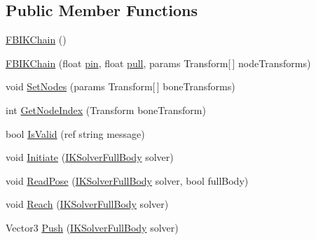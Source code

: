 \subsection*{Public Member Functions}
\begin{DoxyCompactItemize}
\item 
\mbox{\hyperlink{class_root_motion_1_1_final_i_k_1_1_f_b_i_k_chain_a2b1b04740285bfe0251784ab66a3631b}{F\+B\+I\+K\+Chain}} ()
\item 
\mbox{\hyperlink{class_root_motion_1_1_final_i_k_1_1_f_b_i_k_chain_a662dea6c56ed0f81a2218f8fcbd4b2e3}{F\+B\+I\+K\+Chain}} (float \mbox{\hyperlink{class_root_motion_1_1_final_i_k_1_1_f_b_i_k_chain_a389508e3ea390ab5599169de3f98514b}{pin}}, float \mbox{\hyperlink{class_root_motion_1_1_final_i_k_1_1_f_b_i_k_chain_a68367cba3452457c0dea9ed4918f6e62}{pull}}, params Transform\mbox{[}$\,$\mbox{]} node\+Transforms)
\item 
void \mbox{\hyperlink{class_root_motion_1_1_final_i_k_1_1_f_b_i_k_chain_aad75789bdd403e5482af023ec0cc47d7}{Set\+Nodes}} (params Transform\mbox{[}$\,$\mbox{]} bone\+Transforms)
\item 
int \mbox{\hyperlink{class_root_motion_1_1_final_i_k_1_1_f_b_i_k_chain_a4158249eab77a3f471243a23e893e783}{Get\+Node\+Index}} (Transform bone\+Transform)
\item 
bool \mbox{\hyperlink{class_root_motion_1_1_final_i_k_1_1_f_b_i_k_chain_a29b16757a3f6914b742a0d3561529d24}{Is\+Valid}} (ref string message)
\item 
void \mbox{\hyperlink{class_root_motion_1_1_final_i_k_1_1_f_b_i_k_chain_a920f4ea3e2aa7ca61a6e87aa1e01de9a}{Initiate}} (\mbox{\hyperlink{class_root_motion_1_1_final_i_k_1_1_i_k_solver_full_body}{I\+K\+Solver\+Full\+Body}} solver)
\item 
void \mbox{\hyperlink{class_root_motion_1_1_final_i_k_1_1_f_b_i_k_chain_a588a6e19aec22732f921ec4083786c83}{Read\+Pose}} (\mbox{\hyperlink{class_root_motion_1_1_final_i_k_1_1_i_k_solver_full_body}{I\+K\+Solver\+Full\+Body}} solver, bool full\+Body)
\item 
void \mbox{\hyperlink{class_root_motion_1_1_final_i_k_1_1_f_b_i_k_chain_a6c3e42a7ffd67e7ec3704b501d4ed964}{Reach}} (\mbox{\hyperlink{class_root_motion_1_1_final_i_k_1_1_i_k_solver_full_body}{I\+K\+Solver\+Full\+Body}} solver)
\item 
Vector3 \mbox{\hyperlink{class_root_motion_1_1_final_i_k_1_1_f_b_i_k_chain_acbe23897fbca5d475e2fdcc6b275e44f}{Push}} (\mbox{\hyperlink{class_root_motion_1_1_final_i_k_1_1_i_k_solver_full_body}{I\+K\+Solver\+Full\+Body}} solver)

\end{DoxyCompactItemize}
